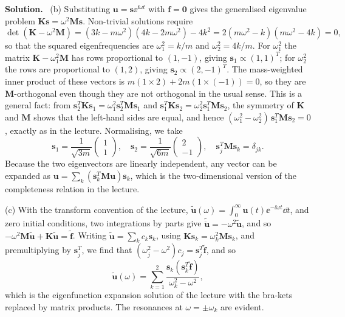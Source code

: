 \documentclass[a4paper,12pt]{paper}
\newenvironment{solution}{\par\noindent\textbf{Solution.}\ }{\par\medskip}
\begin{document}
\begin{solution}
(b) Substituting $\mathbf{u}=\mathbf{s}\ee^{\ii\omega t}$ with $\mathbf{f}=\mathbf{0}$ gives the
generalised eigenvalue problem $\mathbf{K}\mathbf{s}=\omega^{2}\mathbf{M}\mathbf{s}$. Non-trivial
solutions require
\begin{equation}
\det(\mathbf{K}-\omega^{2}\mathbf{M})=(3k-m\omega^{2})(4k-2m\omega^{2})-4k^{2}
=2(m\omega^{2}-k)(m\omega^{2}-4k)=0,
\label{eq:2}
\end{equation}
so that the squared eigenfrequencies are $\omega_{1}^{2}=k/m$ and $\omega_{2}^{2}=4k/m$. For
$\omega_{1}^{2}$ the matrix $\mathbf{K}-\omega_{1}^{2}\mathbf{M}$ has rows proportional to
$(1,-1)$, giving $\mathbf{s}_{1}\propto(1,1)^{T}$; for $\omega_{2}^{2}$ the rows are proportional
to $(1,2)$, giving $\mathbf{s}_{2}\propto(2,-1)^{T}$. The mass-weighted inner product of these
vectors is $m(1\times 2)+2m(1\times(-1))=0$, so they are $\mathbf{M}$-orthogonal even though they
are not orthogonal in the usual sense. This is a general fact: from
$\mathbf{s}_{2}^{T}\mathbf{K}\mathbf{s}_{1}=\omega_{1}^{2}\mathbf{s}_{2}^{T}\mathbf{M}\mathbf{s}_{1}$
and $\mathbf{s}_{1}^{T}\mathbf{K}\mathbf{s}_{2}=\omega_{2}^{2}\mathbf{s}_{1}^{T}\mathbf{M}\mathbf{s}_{2}$,
the symmetry of $\mathbf{K}$ and $\mathbf{M}$ shows that the left-hand sides are equal, and hence
$(\omega_{1}^{2}-\omega_{2}^{2})\,\mathbf{s}_{1}^{T}\mathbf{M}\mathbf{s}_{2}=0$, exactly as in the
lecture. Normalising, we take
\begin{equation}
\mathbf{s}_{1}=\frac{1}{\sqrt{3m}}\begin{pmatrix}1\\1\end{pmatrix},\quad
\mathbf{s}_{2}=\frac{1}{\sqrt{6m}}\begin{pmatrix}2\\-1\end{pmatrix},\quad
\mathbf{s}_{j}^{T}\mathbf{M}\mathbf{s}_{k}=\delta_{jk}.
\label{eq:3}
\end{equation}
Because the two eigenvectors are linearly independent, any vector can be expanded as
$\mathbf{u}=\sum_{k}(\mathbf{s}_{k}^{T}\mathbf{M}\mathbf{u})\mathbf{s}_{k}$, which is the
two-dimensional version of the completeness relation in the lecture.

(c) With the transform convention of the lecture,
$\tilde{\mathbf{u}}(\omega)=\int_{0}^{\infty}\mathbf{u}(t)\ee^{-\ii\omega t}\dd t$, and zero
initial conditions, two integrations by parts give
$\widetilde{\ddot{\mathbf{u}}}=-\omega^{2}\tilde{\mathbf{u}}$, and so
$-\omega^{2}\mathbf{M}\tilde{\mathbf{u}}+\mathbf{K}\tilde{\mathbf{u}}=\tilde{\mathbf{f}}$.
Writing $\tilde{\mathbf{u}}=\sum_{k}c_{k}\mathbf{s}_{k}$, using
$\mathbf{K}\mathbf{s}_{k}=\omega_{k}^{2}\mathbf{M}\mathbf{s}_{k}$, and premultiplying by
$\mathbf{s}_{j}^{T}$, we find that $(\omega_{j}^{2}-\omega^{2})c_{j}=\mathbf{s}_{j}^{T}\tilde{\mathbf{f}}$,
and so
\begin{equation}
\tilde{\mathbf{u}}(\omega)=\sum_{k=1}^{2}\frac{\mathbf{s}_{k}(\mathbf{s}_{k}^{T}\tilde{\mathbf{f}})}{\omega_{k}^{2}-\omega^{2}},
\label{eq:4}
\end{equation}
which is the eigenfunction expansion solution of the lecture with the bra-kets replaced by matrix
products. The resonances at $\omega=\pm\omega_{k}$ are evident.


\end{solution}
\end{document}
